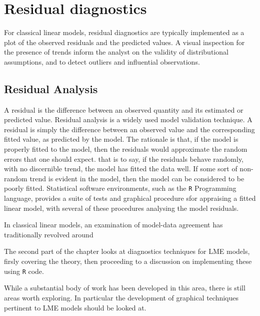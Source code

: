 \documentclass[Main.tex]{subfiles}
\begin{document}
	\section{Residual diagnostics} %
	For classical linear models, residual diagnostics are typically implemented as a plot of the observed residuals and the predicted values. A visual inspection for the presence of trends inform the analyst on the validity of distributional assumptions, and to detect outliers and influential observations.
	
			\subsection{Residual Analysis}
			A residual is the difference between an observed quantity and its
			estimated or predicted value. 
			Residual analysis is a widely used model validation technique. A residual is simply the difference between an observed value and the corresponding fitted value, as predicted by the model. The rationale is that, if the model is properly fitted to the model, then the residuals would approximate the random errors that one should expect.
			that is to say, if the residuals behave randomly, with no discernible trend, the model has fitted the data well. If some sort of non-random trend is evident in the model, then the model can be considered to be poorly fitted.
			Statistical software environments, such as the \texttt{R} Programming language, provides a suite of tests and graphical procedure sfor appraising a fitted linear model, with several 
			of these procedures analysing the model residuals.
			
			In classical linear models, an examination of model-data agreement has traditionally revolved around
			
			The second part of the chapter looks at diagnostics techniques for LME models, firsly covering the theory, then proceeding to a discussion on 
			implementing these using \texttt{R} code.
			
			While a substantial body of work has been developed in this area, there is still areas worth exploring. 
			In particular the development of graphical techniques pertinent to LME models should be looked at.
			
			
			
			
\end{document}

